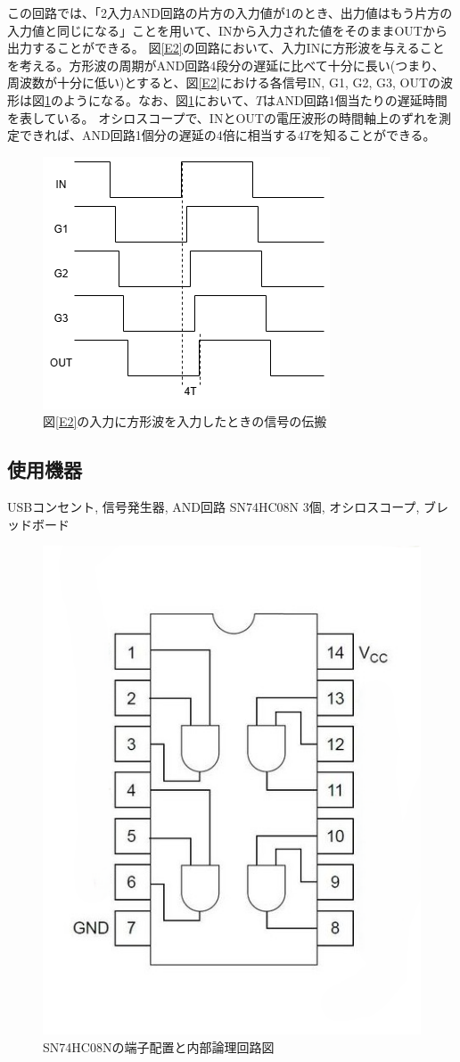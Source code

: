 \documentclass[uplatex, a4j, dvipdfmx]{jsarticle}
\begin{document}
この回路では、「2入力AND回路の片方の入力値が1のとき、出力値はもう片方の入力値と同じになる」ことを用いて、INから入力された値をそのままOUTから出力することができる。
図\ref{E2}の回路において、入力INに方形波を与えることを考える。方形波の周期がAND回路4段分の遅延に比べて十分に長い(つまり、周波数が十分に低い)とすると、図\ref{E2}における各信号IN, G1, G2, G3, OUTの波形は図\ref{E3}のようになる。なお、図\ref{E3}において、$T$はAND回路1個当たりの遅延時間を表している。
オシロスコープで、INとOUTの電圧波形の時間軸上のずれを測定できれば、AND回路1個分の遅延の4倍に相当する$4T$を知ることができる。
\begin{figure}[htbp]
    \centering
    \includegraphics[width=0.7\linewidth]{picture/E3.png}
    \caption{図\ref{E2}の入力に方形波を入力したときの信号の伝搬}
    \label{E3}
\end{figure}

\subsection{使用機器}
USBコンセント, 信号発生器, AND回路 SN74HC08N 3個, オシロスコープ, ブレッドボード
\begin{figure}[htbp]
    \centering
    \includegraphics[width=0.5\linewidth]{picture/E4.png}
    \caption{SN74HC08Nの端子配置と内部論理回路図}
    \label{E4}
\end{figure}
\end{document}
